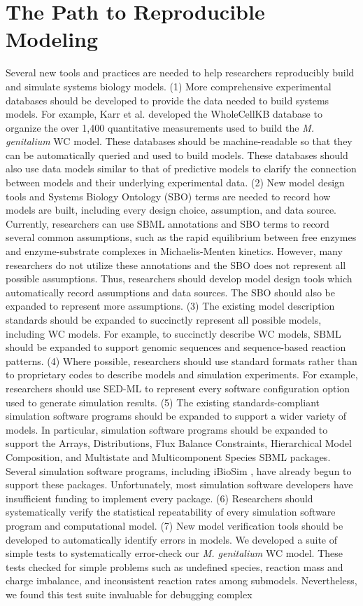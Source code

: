 \documentclass[journal,transmag,twoside]{IEEEtran}
\begin{document}
\section{The Path to Reproducible Modeling}

Several new tools and practices are needed to help researchers reproducibly build and simulate systems biology models. (1) More comprehensive experimental databases should be developed to provide the data needed to build systems models.  For example, Karr et al. developed the WholeCellKB database \cite{karr2013wholecellkb} to organize the over 1,400 quantitative measurements used to build the \textit{M. genitalium} WC model. These databases should be machine-readable so that they can be automatically queried and used to build models. These databases should also use data models similar to that of predictive models to clarify the connection between models and their underlying experimental data. (2) New model design tools and Systems Biology Ontology (SBO) \cite{juty2013systems} terms are needed to record how models are built, including every design choice, assumption, and data source. Currently, researchers can use SBML annotations and SBO terms to record several common assumptions, such as the rapid equilibrium between free enzymes and enzyme-substrate complexes in Michaelis-Menten kinetics. However, many researchers do not utilize these annotations and the SBO does not represent all possible assumptions. Thus, researchers should develop model design tools which automatically record assumptions and data sources. The SBO should also be expanded to represent more assumptions. (3) The existing model description standards should be expanded to succinctly represent all possible models, including WC models. For example, to succinctly describe WC models, SBML should be expanded to support genomic sequences and sequence-based reaction patterns. (4) Where possible, researchers should use standard formats rather than to proprietary codes to describe models and simulation experiments. For example, researchers should use SED-ML to represent every software configuration option used to generate simulation results. (5) The existing standards-compliant simulation software programs should be expanded to support a wider variety of models. In particular, simulation software programs should be expanded to support the Arrays, Distributions, Flux Balance Constraints, Hierarchical Model Composition, and Multistate and Multicomponent Species SBML packages. Several simulation software programs, including iBioSim \cite{Stevens2013}, have already begun to support these packages. Unfortunately, most simulation software developers have insufficient funding to implement every package. (6) Researchers should systematically verify the statistical repeatability of every simulation software program and computational model. (7) New model verification tools should be developed to automatically identify errors in models. We developed a suite of simple tests to systematically error-check our \textit{M. genitalium} WC model. These tests checked for simple problems such as undefined species, reaction mass and charge imbalance, and inconsistent reaction rates among submodels. Nevertheless, we found this test suite invaluable for debugging complex 
\end{document}
